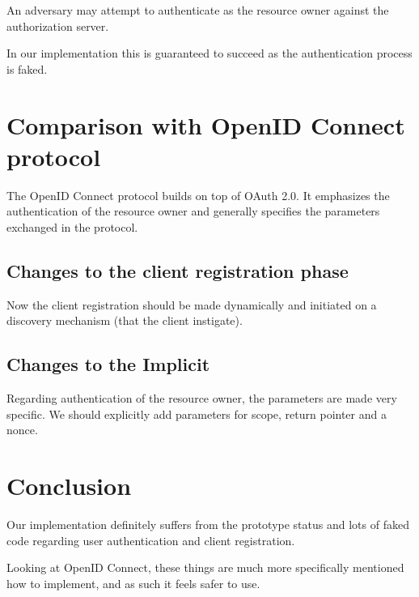 \documentclass[12pt, a4paper]{article}
\begin{document}
  An adversary may attempt to authenticate as the resource owner against
  the authorization server.

  In our implementation this is guaranteed to succeed as the
  authentication process is faked.

\section*{Comparison with OpenID Connect protocol}

  The OpenID Connect protocol builds on top of OAuth 2.0.
  It emphasizes the authentication of the resource owner and generally
  specifies the parameters exchanged in the protocol.

  \subsection*{Changes to the client registration phase}

  Now the client registration should be made dynamically and initiated
  on a discovery mechanism (that the client instigate).

  \subsection*{Changes to the Implicit}

  Regarding authentication of the resource owner, the parameters are
  made very specific.
  We should explicitly add parameters for scope, return pointer and a
  nonce.

  \section*{Conclusion}

  Our implementation definitely suffers from the prototype status and
  lots of faked code regarding user authentication and client
  registration.

  Looking at OpenID Connect, these things are much more specifically
  mentioned how to implement, and as such it feels safer to use.
\end{document}
